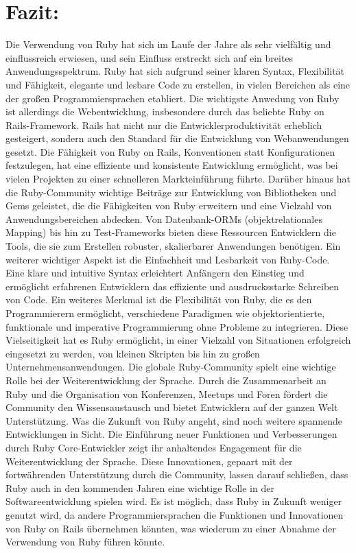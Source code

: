 \documentclass{article}
\begin{document}
\section*{Fazit:}
Die Verwendung von Ruby hat sich im Laufe der Jahre als sehr vielfältig und einflussreich erwiesen, und sein Einfluss erstreckt sich auf ein breites Anwendungsspektrum.
Ruby hat sich aufgrund seiner klaren Syntax, Flexibilität und Fähigkeit, elegante und lesbare Code zu erstellen, in vielen Bereichen als eine der großen Programmiersprachen etabliert.
Die wichtigste Anwedung von Ruby ist allerdings die Webentwicklung, insbesondere durch das beliebte Ruby on Rails-Framework.
Rails hat nicht nur die Entwicklerproduktivität erheblich gesteigert, sondern auch den Standard für die Entwicklung von Webanwendungen gesetzt.
Die Fähigkeit von Ruby on Rails, Konventionen statt Konfigurationen festzulegen, hat eine effiziente und konsistente Entwicklung ermöglicht, was bei vielen Projekten zu einer schnelleren Markteinführung führte.
Darüber hinaus hat die Ruby-Community wichtige Beiträge zur Entwicklung von Bibliotheken und Gems geleistet, die die Fähigkeiten von Ruby erweitern und eine Vielzahl von Anwendungsbereichen abdecken.
Von Datenbank-ORMs (objektrelationales Mapping) bis hin zu Test-Frameworks bieten diese Ressourcen Entwicklern die Tools, die sie zum Erstellen robuster, skalierbarer Anwendungen benötigen.
Ein weiterer wichtiger Aspekt ist die Einfachheit und Lesbarkeit von Ruby-Code.
Eine klare und intuitive Syntax erleichtert Anfängern den Einstieg und ermöglicht erfahrenen Entwicklern das effiziente und ausdrucksstarke Schreiben von Code.
Ein weiteres Merkmal ist die Flexibilität von Ruby, die es den Programmierern ermöglicht, verschiedene Paradigmen wie objektorientierte, funktionale und imperative Programmierung ohne Probleme zu integrieren.
Diese Vielseitigkeit hat es Ruby ermöglicht, in einer Vielzahl von Situationen erfolgreich eingesetzt zu werden, von kleinen Skripten bis hin zu großen Unternehmensanwendungen.
Die globale Ruby-Community spielt eine wichtige Rolle bei der Weiterentwicklung der Sprache.
Durch die Zusammenarbeit an Ruby und die Organisation von Konferenzen, Meetups und Foren fördert die Community den Wissensaustausch und bietet Entwicklern auf der ganzen Welt Unterstützung.
Was die Zukunft von Ruby angeht, sind noch weitere spannende Entwicklungen in Sicht.
Die Einführung neuer Funktionen und Verbesserungen durch Ruby Core-Entwickler zeigt ihr anhaltendes Engagement für die Weiterentwicklung der Sprache.
Diese Innovationen, gepaart mit der fortwährenden Unterstützung durch die Community, lassen darauf schließen, dass Ruby auch in den kommenden Jahren eine wichtige Rolle in der Softwareentwicklung spielen wird. Es ist möglich, dass Ruby in Zukunft weniger genutzt wird, da andere Programmiersprachen die Funktionen und Innovationen von Ruby on Rails übernehmen könnten, was wiederum zu einer Abnahme der Verwendung von Ruby führen könnte.
\end{document}
